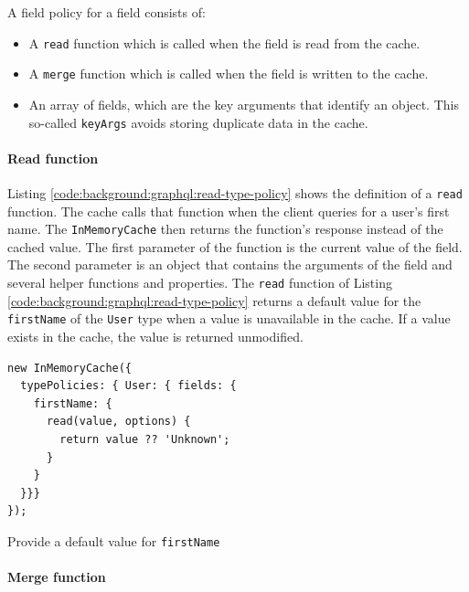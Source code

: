\bigskip

\noindent A field policy for a field consists of: \cite{misc:-:background:graphql:apollo-client-cache-reading-writing}

\begin{itemize}
  \item A \texttt{read} function which is called when the field is read from the cache.
  \item A \texttt{merge} function which is called when the field is written to the cache.
  \item An array of fields, which are the key arguments that identify an object. This so-called \texttt{keyArgs} avoids storing duplicate data in the cache.
\end{itemize}

\paragraph{Read function}

Listing \ref{code:background:graphql:read-type-policy} shows the definition of a \texttt{read} function. The cache calls that function when the client queries for a user's first name. The \texttt{InMemoryCache} then returns the function's response instead of the cached value. The first parameter of the function is the current value of the field. The second parameter is an object that contains the arguments of the field and several helper functions and properties. \cite{misc:-:background:graphql:apollo-client-cache-reading-writing} The \texttt{read} function of Listing \ref{code:background:graphql:read-type-policy} returns a default value for the \texttt{firstName} of the \texttt{User} type when a value is unavailable in the cache. If a value exists in the cache, the value is returned unmodified.

\ifshowListings
\begin{listing}[H]
    \begin{verbatim}
new InMemoryCache({
  typePolicies: { User: { fields: {
    firstName: {
      read(value, options) {
        return value ?? 'Unknown';
      }
    }
  }}}
});
    \end{verbatim}
    \caption{Provide a default value for \texttt{firstName}}\label{code:background:graphql:read-type-policy}
\end{listing}
\fi

\paragraph{Merge function}


